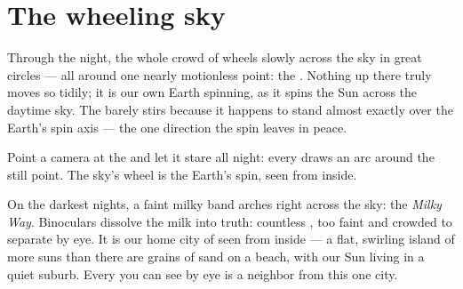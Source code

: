 \section{The wheeling sky}

\begin{proposition}\label{prop:g5:stars-night-sky:wheel}
Through the night, the whole crowd of  wheels slowly across
the sky in great circles --- all around one nearly motionless
point: the . Nothing up there truly moves so tidily; it
is our own Earth spinning, as it spins the Sun across the daytime
sky. The  barely stirs because it happens to stand
almost exactly over the Earth's spin axis --- the one direction
the spin leaves in peace.
\end{proposition}

\begin{omfigure}

{\small Point a camera at the  and let it stare all
night: every  draws an arc around the still point. The sky's
wheel is the Earth's spin, seen from inside.}
\end{omfigure}

\begin{example}\label{ex:g5:stars-night-sky:milkyway}
On the darkest nights, a faint milky band arches right across the
sky: the \emph{Milky Way}. Binoculars dissolve the
milk into truth: countless , too faint and crowded to
separate by eye. It is our home city of  seen from inside ---
a flat, swirling island of more suns than there are grains of sand
on a beach, with our Sun living in a quiet suburb. Every  you
can see by eye is a neighbor from this one city.
\end{example}

